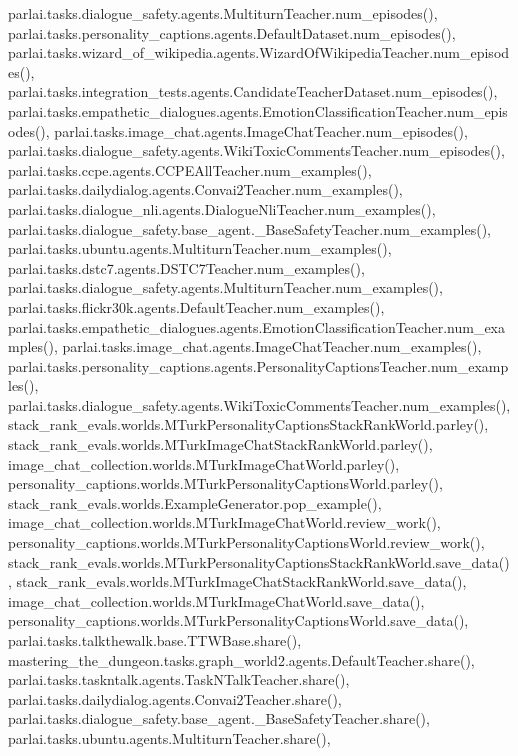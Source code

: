 parlai.\+tasks.\+dialogue\+\_\+safety.\+agents.\+Multiturn\+Teacher.\+num\+\_\+episodes(), parlai.\+tasks.\+personality\+\_\+captions.\+agents.\+Default\+Dataset.\+num\+\_\+episodes(), parlai.\+tasks.\+wizard\+\_\+of\+\_\+wikipedia.\+agents.\+Wizard\+Of\+Wikipedia\+Teacher.\+num\+\_\+episodes(), parlai.\+tasks.\+integration\+\_\+tests.\+agents.\+Candidate\+Teacher\+Dataset.\+num\+\_\+episodes(), parlai.\+tasks.\+empathetic\+\_\+dialogues.\+agents.\+Emotion\+Classification\+Teacher.\+num\+\_\+episodes(), parlai.\+tasks.\+image\+\_\+chat.\+agents.\+Image\+Chat\+Teacher.\+num\+\_\+episodes(), parlai.\+tasks.\+dialogue\+\_\+safety.\+agents.\+Wiki\+Toxic\+Comments\+Teacher.\+num\+\_\+episodes(), parlai.\+tasks.\+ccpe.\+agents.\+C\+C\+P\+E\+All\+Teacher.\+num\+\_\+examples(), parlai.\+tasks.\+dailydialog.\+agents.\+Convai2\+Teacher.\+num\+\_\+examples(), parlai.\+tasks.\+dialogue\+\_\+nli.\+agents.\+Dialogue\+Nli\+Teacher.\+num\+\_\+examples(), parlai.\+tasks.\+dialogue\+\_\+safety.\+base\+\_\+agent.\+\_\+\+Base\+Safety\+Teacher.\+num\+\_\+examples(), parlai.\+tasks.\+ubuntu.\+agents.\+Multiturn\+Teacher.\+num\+\_\+examples(), parlai.\+tasks.\+dstc7.\+agents.\+D\+S\+T\+C7\+Teacher.\+num\+\_\+examples(), parlai.\+tasks.\+dialogue\+\_\+safety.\+agents.\+Multiturn\+Teacher.\+num\+\_\+examples(), parlai.\+tasks.\+flickr30k.\+agents.\+Default\+Teacher.\+num\+\_\+examples(), parlai.\+tasks.\+empathetic\+\_\+dialogues.\+agents.\+Emotion\+Classification\+Teacher.\+num\+\_\+examples(), parlai.\+tasks.\+image\+\_\+chat.\+agents.\+Image\+Chat\+Teacher.\+num\+\_\+examples(), parlai.\+tasks.\+personality\+\_\+captions.\+agents.\+Personality\+Captions\+Teacher.\+num\+\_\+examples(), parlai.\+tasks.\+dialogue\+\_\+safety.\+agents.\+Wiki\+Toxic\+Comments\+Teacher.\+num\+\_\+examples(), stack\+\_\+rank\+\_\+evals.\+worlds.\+M\+Turk\+Personality\+Captions\+Stack\+Rank\+World.\+parley(), stack\+\_\+rank\+\_\+evals.\+worlds.\+M\+Turk\+Image\+Chat\+Stack\+Rank\+World.\+parley(), image\+\_\+chat\+\_\+collection.\+worlds.\+M\+Turk\+Image\+Chat\+World.\+parley(), personality\+\_\+captions.\+worlds.\+M\+Turk\+Personality\+Captions\+World.\+parley(), stack\+\_\+rank\+\_\+evals.\+worlds.\+Example\+Generator.\+pop\+\_\+example(), image\+\_\+chat\+\_\+collection.\+worlds.\+M\+Turk\+Image\+Chat\+World.\+review\+\_\+work(), personality\+\_\+captions.\+worlds.\+M\+Turk\+Personality\+Captions\+World.\+review\+\_\+work(), stack\+\_\+rank\+\_\+evals.\+worlds.\+M\+Turk\+Personality\+Captions\+Stack\+Rank\+World.\+save\+\_\+data(), stack\+\_\+rank\+\_\+evals.\+worlds.\+M\+Turk\+Image\+Chat\+Stack\+Rank\+World.\+save\+\_\+data(), image\+\_\+chat\+\_\+collection.\+worlds.\+M\+Turk\+Image\+Chat\+World.\+save\+\_\+data(), personality\+\_\+captions.\+worlds.\+M\+Turk\+Personality\+Captions\+World.\+save\+\_\+data(), parlai.\+tasks.\+talkthewalk.\+base.\+T\+T\+W\+Base.\+share(), mastering\+\_\+the\+\_\+dungeon.\+tasks.\+graph\+\_\+world2.\+agents.\+Default\+Teacher.\+share(), parlai.\+tasks.\+taskntalk.\+agents.\+Task\+N\+Talk\+Teacher.\+share(), parlai.\+tasks.\+dailydialog.\+agents.\+Convai2\+Teacher.\+share(), parlai.\+tasks.\+dialogue\+\_\+safety.\+base\+\_\+agent.\+\_\+\+Base\+Safety\+Teacher.\+share(), parlai.\+tasks.\+ubuntu.\+agents.\+Multiturn\+Teacher.\+share(), 
